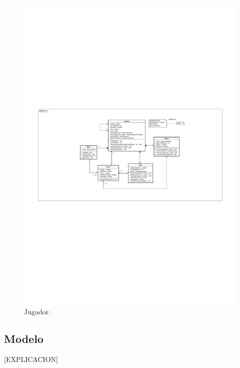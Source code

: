 \begin{figure}[H]
	\centering
	\includegraphics[scale=0.8]{includes/class_Jugador}
	\caption{Jugador.}
	\label{class_Jugador}
\end{figure}

\subsection{Modelo}

[EXPLICACION]

